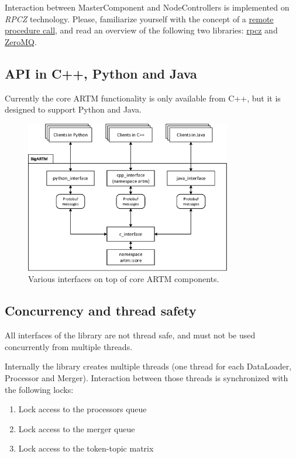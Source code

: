 \documentclass[11pt,a4paper,twoside]{report}
\begin{document}
Interaction between MasterComponent and NodeControllers is implemented on \emph{RPCZ} technology.
Please, familiarize yourself with the concept of a
\href{en.wikipedia.org/wiki/Remote_procedure_call}{remote procedure call},
and read an overview of the following two libraries:
\href{code.google.com/p/rpcz/}{rpcz} and \href{http://zeromq.org}{ZeroMQ}.

\subsection{API in C++, Python and Java}
Currently the core ARTM functionality is only available from C++,
but it is designed to support Python and Java.

\begin{figure}[h!]
\begin{centering}
\includegraphics[width=90mm]{diagramm_BigARTM.eps}
\caption{Various interfaces on top of core ARTM components.}
\label{fig:diagramm_BigARTM}
\end{centering}
\end{figure}

\subsection{Concurrency and thread safety}
All interfaces of the library are not thread safe,
and must not be used concurrently from multiple threads.

Internally the library creates multiple threads
(one thread for each DataLoader, Processor and Merger).
Interaction between those threads is synchronized with the following locks:
\begin{enumerate}
    \item Lock access to the processors queue
    \item Lock access to the merger queue
    \item Lock access to the token-topic matrix
\end{enumerate}
\end{document}
